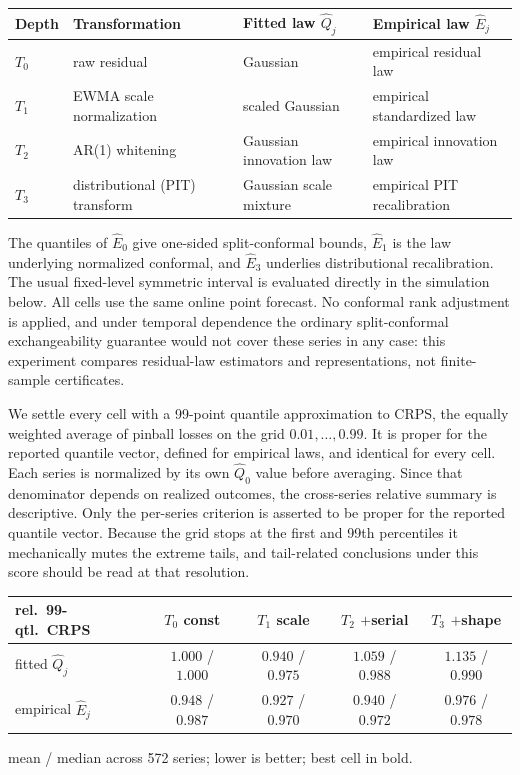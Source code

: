 \documentclass[11pt]{article}
\theoremstyle{remark}
\begin{document}
\begin{center}
\small
\begin{tabular}{llll}
\toprule
Depth & Transformation & Fitted law $\widehat Q_j$ & Empirical law $\widehat E_j$\\
\midrule
$T_0$ & raw residual & Gaussian & empirical residual law\\
$T_1$ & EWMA scale normalization & scaled Gaussian & empirical standardized law\\
$T_2$ & AR(1) whitening & Gaussian innovation law & empirical innovation law\\
$T_3$ & distributional (PIT) transform & Gaussian scale mixture & empirical PIT recalibration\\
\bottomrule
\end{tabular}
\end{center}

The quantiles of $\widehat E_0$ give one-sided split-conformal bounds, $\widehat E_1$ is the
law underlying normalized conformal, and $\widehat E_3$ underlies distributional
recalibration. The usual fixed-level symmetric interval is evaluated directly in the
simulation below. All cells use the same online point forecast. No conformal rank adjustment
is applied, and under temporal dependence the ordinary split-conformal exchangeability
guarantee would not cover these series in any case: this experiment compares residual-law
estimators and representations, not finite-sample certificates.

We settle every cell with a 99-point quantile approximation to CRPS, the equally weighted
average of pinball losses on the grid $0.01,\dots,0.99$. It is proper for the reported
quantile vector, defined for empirical laws, and identical for every cell. Each series is normalized by its own $\widehat Q_0$ value before averaging. Since that
denominator depends on realized outcomes, the cross-series relative summary is descriptive.
Only the per-series criterion is asserted to be proper for the reported quantile vector. Because the grid stops at the first
and 99th percentiles it mechanically mutes the extreme tails, and tail-related conclusions
under this score should be read at that resolution.

\begin{center}
\begin{tabular}{lcccc}
\toprule
rel.\ 99-qtl.\ CRPS & $T_0$ const & $T_1$ scale & $T_2$ $+$serial & $T_3$ $+$shape\\
\midrule
fitted $\widehat Q_j$ & $1.000$ / $1.000$ & $0.940$ / $0.975$ & $1.059$ / $0.988$ & $1.135$ / $0.990$\\
empirical $\widehat E_j$ & $0.948$ / $0.987$ & $\mathbf{0.927}$ / $\mathbf{0.970}$ & $0.940$ / $0.972$ & $0.976$ / $0.978$\\
\bottomrule
\end{tabular}
\par\smallskip
{\small mean / median across 572 series; lower is better; best cell in bold.}
\end{center}
\end{document}
